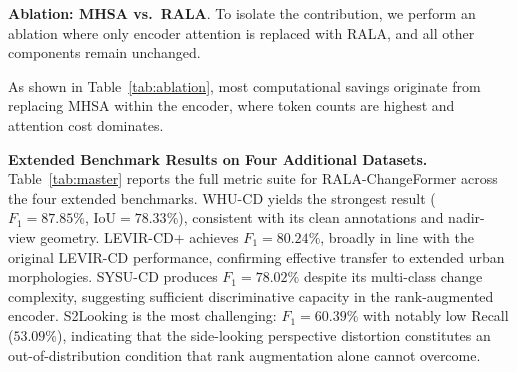 \documentclass[runningheads]{llncs}
\newcommand{\journal}[1]{{\color{orange}#1}}
\begin{document}
\noindent \textbf{Ablation: MHSA vs.\ RALA}. To isolate the contribution, we
perform an ablation where only encoder attention is replaced with RALA, and all
other components remain unchanged.

\begin{table}[h!]
\caption{Ablation study isolating the encoder attention mechanism \cite{acuna2026efficient}.}
\label{tab:ablation}
\centering
{}
\end{table}

\noindent As shown in Table~\ref{tab:ablation}, most computational savings
originate from replacing MHSA within the encoder, where token counts are
highest and attention cost dominates.

\journal{%
\noindent \textbf{Extended Benchmark Results on Four Additional Datasets.}
Table~\ref{tab:master} reports the full metric suite for RALA-ChangeFormer
across the four extended benchmarks.
WHU-CD yields the strongest result ($F_1=87.85\%$, $\mathrm{IoU}=78.33\%$),
consistent with its clean annotations and nadir-view geometry.
LEVIR-CD+ achieves $F_1=80.24\%$, broadly in line with the original
LEVIR-CD performance, confirming effective transfer to extended urban morphologies.
SYSU-CD produces $F_1=78.02\%$ despite its multi-class change complexity,
suggesting sufficient discriminative capacity in the rank-augmented encoder.
S2Looking is the most challenging: $F_1=60.39\%$ with notably low Recall
($53.09\%$), indicating that the side-looking perspective distortion constitutes
an out-of-distribution condition that rank augmentation alone cannot overcome.
}
\end{document}

